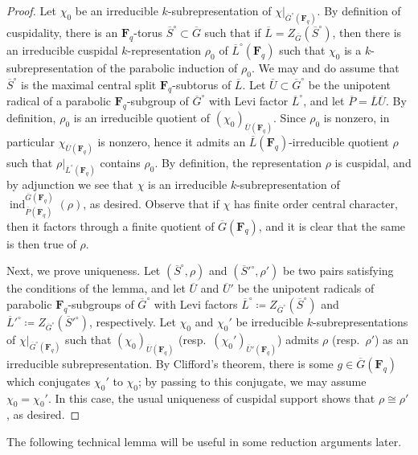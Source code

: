 \documentclass[reqno]{amsart}
\numberwithin{equation}{subsection}
\newcommand{\F}{\mathbf{F}}
\newcommand{\ol}[1]{\overline{#1}}
\DeclareMathOperator{\ind}{ind}
\theoremstyle{remark}
\numberwithin{equation}{subsection}
\numberwithin{figure}{subsection}
\begin{document}
\begin{proof}
    Let $\chi_0$ be an irreducible $k$-subrepresentation of $\chi|_{\ol G^\circ(\F_q)}$. By definition of cuspidality, there is an $\F_q$-torus $\ol S^\circ \subset \ol G$ such that if $\ol L = Z_{\ol G}(\ol S^\circ)$, then there is an irreducible cuspidal $k$-representation $\rho_0$ of $\ol L^\circ(\F_q)$ such that $\chi_0$ is a $k$-subrepresentation of the parabolic induction of $\rho_0$. We may and do assume that $\ol S^\circ$ is the maximal central split $\F_q$-subtorus of $\ol L$. Let $\ol U \subset \ol G^\circ$ be the unipotent radical of a parabolic $\F_q$-subgroup of $\ol G^\circ$ with Levi factor $\ol L^\circ$, and let $\ol P = \ol L \ol U$. By definition, $\rho_0$ is an irreducible quotient of $(\chi_0)_{\ol U(\F_q)}$. Since $\rho_0$ is nonzero, in particular $\chi_{\ol U(\F_q)}$ is nonzero, hence it admits an $\ol L(\F_q)$-irreducible quotient $\rho$ such that $\rho|_{\ol L^\circ(\F_q)}$ contains $\rho_0$. By definition, the representation $\rho$ is cuspidal, and by adjunction we see that $\chi$ is an irreducible $k$-subrepresentation of $\ind_{\ol P(\F_q)}^{\ol G(\F_q)}(\rho)$, as desired. Observe that if $\chi$ has finite order central character, then it factors through a finite quotient of $\ol G(\F_q)$, and it is clear that the same is then true of $\rho$.

    Next, we prove uniqueness. Let $(\ol S^\circ, \rho)$ and $(\ol S'^\circ, \rho')$ be two pairs satisfying the conditions of the lemma, and let $\ol U$ and $\ol U'$ be the unipotent radicals of parabolic $\F_q$-subgroups of $\ol G^\circ$ with Levi factors $\ol L^\circ \coloneqq Z_{\ol G^\circ}(\ol S^\circ)$ and $\ol L'^\circ \coloneqq Z_{\ol G^\circ}(\ol S'^\circ)$, respectively. Let $\chi_0$ and $\chi_0'$ be irreducible $k$-subrepresentations of $\chi|_{\ol G^\circ(\F_q)}$ such that $(\chi_0)_{\ol U(\F_q)}$ (resp.\ $(\chi_0')_{\ol U'(\F_q)}$) admits $\rho$ (resp.\ $\rho'$) as an irreducible subrepresentation. By Clifford's theorem, there is some $g \in \ol G(\F_q)$ which conjugates $\chi_0'$ to $\chi_0$; by passing to this conjugate, we may assume $\chi_0 = \chi_0'$. In this case, the usual uniqueness of cuspidal support \cite[Corollary 5.2]{Hiss93} shows that $\rho \cong \rho'$, as desired.
\end{proof}

The following technical lemma will be useful in some reduction arguments later.
\end{document}
